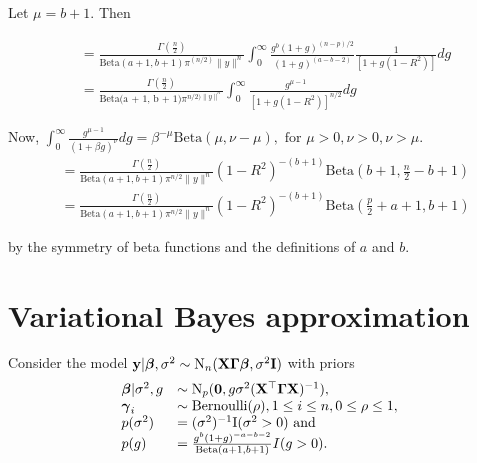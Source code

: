 \documentclass{article}[12pt]
\begin{document}
Let $\mu = b + 1$. Then

\begin{equation*}
\begin{array}{ll}
&=\frac{\Gamma(\frac{n}{2})}{\text{Beta}(a + 1,  b + 1) \pi^(n/2) \| y \|^n}
\int_0^\infty \frac{g^b(1 + g)^{(n - p)/2}}{(1 + g)^{(a - b - 2)}} \frac{1}{[1 + g(1 - R^2)]} dg \\
&= \frac{\Gamma(\frac{n}{2})}{\text{Beta(a + 1, b + 1)} \pi^{n/2) \| y \|^n}}
\int_0^\infty \frac{g^{\mu - 1}}{[1 + g (1 - R^2)]^{n/2}} dg
\end{array}
\end{equation*}

Now, $\int_0^\infty \frac{g^{\mu - 1}}{(1 + \beta g)^\nu} dg = \beta^{-\mu} \text{Beta}(\mu, \nu - \mu), \text{ for } \mu > 0, \nu > 0, \nu > \mu$.
\begin{equation*}
\begin{array}{ll}
&= \frac{\Gamma(\frac{n}{2})}{\text{Beta}(a + 1, b + 1) \pi^{n / 2} \| y \|^n} (1 - R^2)^{-(b + 1)} \text{Beta}(b + 1, \frac{n}{2} - b + 1) \\
&= \frac{\Gamma(\frac{n}{2})}{\text{Beta}(a + 1, b + 1) \pi^{n / 2} \| y \|^n} (1 - R^2)^{-(b + 1)} \text{Beta}(\frac{p}{2} + a + 1, b + 1)
\end{array}
\end{equation*}

by the symmetry of beta functions and the definitions of $a$ and $b$.

\section{Variational Bayes approximation}

\def \I {\text{I}}

Consider the model ${\bf y} | {\boldsymbol \beta}, \sigma^2 \sim \text{N}_n({\bf X} {\boldsymbol \Gamma} {\boldsymbol \beta}, \sigma^2 {\bf I})$ with
priors
\begin{equation*}
\begin{array}{ll}
\vbeta | \sigma^2, g &\sim \text{N}_p(\vzero, g \sigma^2(\mX^\top \mGamma \mX)^{-1}), \\
\vgamma_i &\sim \text{Bernoulli}(\rho), 1 \leq i \leq n, 0 \leq \rho \leq 1, \\
p(\sigma^2) &= (\sigma^2)^{-1} \I(\sigma^2 > 0) \text{ and }\\
p(g) &= \frac{g^b (1 + g)^{-a - b - 2}}{\text{Beta}(a + 1, b + 1)} I(g > 0).
\end{array}
\end{equation*}
\end{document}
